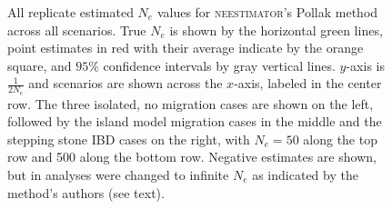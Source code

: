 \begin{landscape}
\begin{figure}[ht]
\centering
{}
\caption[ ~~ - All replicate estimated $N_e$ values for \textsc{neestimator}'s Pollak method across all scenarios.]{All replicate estimated $N_e$ values for \textsc{neestimator}'s Pollak method across all scenarios. True $N_e$ is shown by the horizontal green lines, point estimates in red with their average indicate by the orange square, and $95\%$ confidence intervals by gray vertical lines. $y$-axis is $\frac{1}{2 N_e}$ and scenarios are shown across the $x$-axis, labeled in the center row. The three isolated, no migration cases are shown on the left, followed by the island model migration cases in the middle and the stepping stone IBD cases on the right, with $N_e = 50$ along the top row and 500 along the bottom row. Negative estimates are shown, but in analyses were changed to infinite $N_e$ as indicated by the method's authors (see text).}
\label{fig:supp_pollak}
\end{figure}



\end{landscape}
